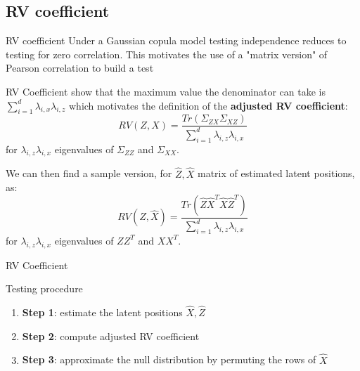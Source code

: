 \documentclass[10.5pt]{beamer}
\begin{document}
\subsection{RV coefficient}
\begin{frame}{RV coefficient}
Under a Gaussian copula model testing independence reduces to testing for zero correlation. This motivates the use of a "matrix version" of Pearson correlation to build a test

\end{frame}

\begin{frame}{RV Coefficient}
\vspace{0.5em}
\citet{mordant_measuring_2021} show that the maximum value the denominator can take is $\sum_{i=1}^d \lambda_{i, x}\lambda_{i, z}$ which motivates the definition of the \textbf{adjusted RV coefficient}:
\[
 RV(Z, X) = \frac{Tr(\Sigma_{ZX}\Sigma_{XZ})}{\sum_{i=1}^d \lambda_{i, z}\lambda_{i, x}}
\]
for $\lambda_{i, z}\lambda_{i, x}$ eigenvalues of $\Sigma_{ZZ}$ and $\Sigma_{XX}$.
\vspace{.5em}

We can then find a sample version, for $\hat{Z}, \hat{X}$ matrix of estimated latent positions, as:
\[
RV(\hat{Z}, \hat{X}) = \frac{Tr(\hat{Z}\hat{X}^T\hat{X}\hat{Z}^T)}{\sum_{i=1}^d \lambda_{i, z}\lambda_{i, x}}
\]
for $\lambda_{i, z}\lambda_{i, x}$ eigenvalues of $ZZ^T$ and $XX^T$.
\end{frame}

\begin{frame}{RV Coefficient}
\begin{block}{Testing procedure}
\begin{enumerate}
    \item \textbf{Step 1}: estimate the latent positions $\hat{X}, \hat{Z}$ 
     \item \textbf{Step 2}: compute adjusted RV coefficient
     \item \textbf{Step 3}: approximate the null distribution by permuting the rows of $\hat{X}$
\end{enumerate} 
\end{block}
\end{frame}
\end{document}
